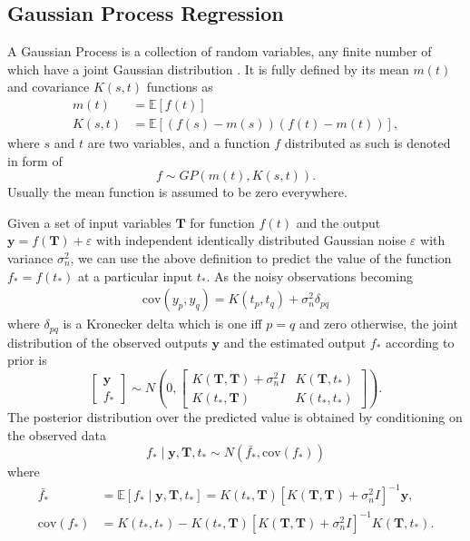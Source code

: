 \subsection{Gaussian Process Regression}

A Gaussian Process is a collection of random variables, any finite number of which have a joint Gaussian distribution \cite{b_gpml}. It is fully defined by its mean $m(t)$ and covariance $K(s,t)$ functions as
\begin{align}
m(t)&=\mathbb{E}[f(t)] \\
K(s,t)&=\mathbb{E}[(f(s)-m(s)) (f(t)-m(t))],
\end{align}
where $s$ and $t$ are two variables, and a function $f$ distributed as such is denoted in form of
\begin{equation}
f \sim GP(m(t),K(s,t)).
\end{equation}
Usually the mean function is assumed to be zero everywhere. 

Given a set of input variables $\mathbf{T}$ for function $f(t)$ and the output $\mathbf{y}=f(\mathbf{T})+\varepsilon$ with independent identically distributed Gaussian noise $\varepsilon$ with variance $\sigma_n^2$,  we can use the above definition to predict the value of the function $f_*=f(t_*)$ at a particular input $t_*$. As the noisy observations becoming
\begin{align}\label{covdef}
\text{cov}(y_p,y_q) = K(t_p,t_q)+\sigma_n^2 \delta_{pq}
\end{align}
where $\delta_{pq}$ is a Kronecker delta which is one iff $p=q$ and zero otherwise, the joint distribution of the observed outputs $\mathbf{y}$ and the estimated output $f_*$ according to prior is
\begin{equation}
\left[ \begin{matrix}
\mathbf{y}\\
f_*
\end{matrix} \right] \sim N \left(  
0,\left[   \begin{matrix}
K(\mathbf{T},\mathbf{T}) +\sigma_n^2I& K(\mathbf{T},t_*) \\
K(t_*,\mathbf{T}) & K(t_*,t_*)
\end{matrix}  \right] 
\right).
\end{equation}
The posterior distribution over the predicted value is obtained by conditioning on the observed data
\begin{equation}
f_* \mid  \mathbf{y},\mathbf{T},t_* \sim N(\bar{f_*},\text{cov}(f_*))
\end{equation}
where 
\begin{align}
\bar{f_*}&=\mathbb{E}[f_* \mid  \mathbf{y},\mathbf{T},t_* ]=K(t_*,\mathbf{T})[K(\mathbf{T},\mathbf{T})+\sigma_n^2I]^{-1}\mathbf{y},\\
\text{cov}(f_*)&=K(t_*,t_*)-K(t_*,\mathbf{T})[K(\mathbf{T},\mathbf{T})+\sigma_n^2I]^{-1}K(\mathbf{T},t_*).
\end{align}


